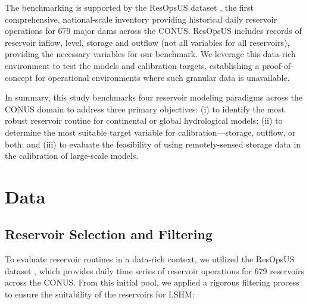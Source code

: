 \documentclass[hess, manuscript]{copernicus}
\providecommand{\DIFdelbegin}{} %
\providecommand{\DIFdelend}{} %
\begin{document}
The benchmarking is supported by the ResOpsUS dataset \citep{Steyaert2022, Steyaert2024}, the first comprehensive, national-scale inventory providing historical daily reservoir operations for 679 major dams across the CONUS. ResOpsUS includes records of reservoir inflow, level, storage and outflow (not all variables for all reservoirs), providing the necessary variables for our benchmark. We leverage this data-rich environment to test the models and calibration targets, establishing a proof-of-concept for operational environments where such granular data is unavailable.

In summary, this study benchmarks four reservoir modeling paradigms across the CONUS domain to address three primary objectives: (i) to identify the most robust reservoir routine for continental or global hydrological models; (ii) to determine the most suitable target variable for calibration—storage, outflow, or both; and (iii) to evaluate the feasibility of using remotely-sensed storage data in the calibration of large-scale models.



\DIFdelbegin %

\DIFdelend \section{Data}
\label{sec:data}

\subsection{Reservoir Selection and Filtering}
\label{sec:reservoir_selection}

To evaluate reservoir routines in a data-rich context, we utilized the ResOpsUS dataset \citep{Steyaert2022, Steyaert2024}, which provides daily time series of reservoir operations for 679 reservoirs across the CONUS. From this initial pool, we applied a rigorous filtering process to ensure the suitability of the reservoirs for LSHM:
\end{document}
